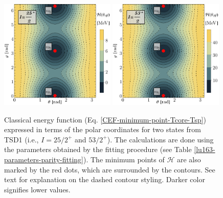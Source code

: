 \begin{figure}
    \centering
    \includegraphics[width=0.49\textwidth]{Chapters/Figures/parity-partners-plots/contour-tsd1-1.pdf}
    \includegraphics[width=0.49\textwidth]{Chapters/Figures/parity-partners-plots/contour-tsd1-2.pdf}
    \caption{Classical energy function (Eq. \ref{CEF-minimum-point-Tcore-Tsp}) expressed in terms of the polar coordinates for two states from TSD1 (i.e., $I=25/2^+$ and $53/2^+$). The calculations are done using the parameters obtained by the fitting procedure (see Table \ref{lu163-parameters-parity-fitting}). The minimum points of $\mathcal{H}$ are also marked by the red dots, which are surrounded by the contours. See text for explanation on the dashed contour styling. Darker color signifies lower values.}
    \label{contour-cef-polar-tsd1}
\end{figure}
